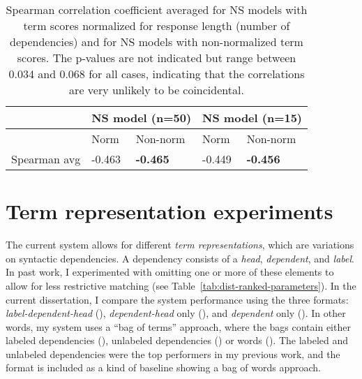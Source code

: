 \begin{table}[htb!]
\begin{center}
\begin{tabular}{|l||l|l||l|l|}
\hline
 & \multicolumn{2}{c||}{NS model (n=50)} & \multicolumn{2}{c|}{NS model (n=15)} \\
\hline
& Norm & Non-norm & Norm & Non-norm \\
\hline
\hline
Spearman avg & -0.463 & \textbf{-0.465} & -0.449 & \textbf{-0.456} \\
\hline
\end{tabular}
\caption{\label{tab:normalize-responses-spearman} Spearman correlation coefficient averaged for NS models with term scores normalized for response length (number of dependencies) and for NS models with non-normalized term scores. The p-values are not indicated but range between 0.034 and 0.068 for all cases, indicating that the correlations are very unlikely to be coincidental.}
\end{center}
\end{table}


\section{Term representation experiments}
\label{sec:exp-term-reps}
The current system allows for different \textit{term representations}, which are variations on syntactic dependencies. A dependency consists of a \textit{head}, \textit{dependent}, and \textit{label}. In past work, I experimented with omitting one or more of these elements to allow for less restrictive matching (see Table~\ref{tab:dist-ranked-parameters}). In the current dissertation, I compare the system performance using the three formats: \textit{label-dependent-head} (), \textit{dependent-head} only (), and \textit{dependent} only (). In other words, my system uses a ``bag of terms'' approach, where the bags contain either labeled dependencies (), unlabeled dependencies () or words (). The labeled and unlabeled dependencies were the top performers in my previous work, and the  format is included as a kind of baseline showing a bag of words approach.

